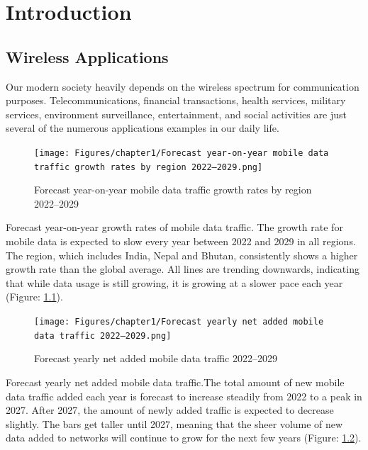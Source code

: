 
\chapter{Introduction} %

\label{Chapter1} %


\section{\textbf{Wireless Applications}}

Our modern society heavily depends on the wireless spectrum for communication purposes.
Telecommunications, financial transactions, health services, military services, environment
surveillance, entertainment, and social activities are just several of the numerous applications
examples in our daily life.
\begin{figure}
    \centering
    \texttt{[image: Figures/chapter1/Forecast year-on-year mobile data traffic growth rates by region 2022–2029.png]}
    \caption{Forecast year-on-year mobile data traffic growth rates by region 2022–2029 \cite{ref26}}
    \label{fig:forecast1}
\end{figure}

Forecast year-on-year growth rates of mobile data traffic. The growth rate for mobile data is expected to slow every year between 2022 and 2029 in all regions. The region, which includes India, Nepal and Bhutan, consistently shows a higher growth rate than the global average.
All lines are trending downwards, indicating that while data usage is still growing, it is growing at a slower pace each year (Figure: \ref{fig:forecast1}).  

\begin{figure}
    \centering
    \texttt{[image: Figures/chapter1/Forecast yearly net added mobile data traffic 2022–2029.png]}
    \caption{Forecast yearly net added mobile data traffic 2022–2029 \cite{ref26}}
    \label{fig:forecast2}
\end{figure}

 Forecast yearly net added mobile data traffic.The total amount of new mobile data traffic added each year is forecast to increase steadily from 2022 to a peak in 2027. After 2027, the amount of newly added traffic is expected to decrease slightly. The bars get taller until 2027, meaning that the sheer volume of new data added to networks will continue to grow for the next few years (Figure: \ref{fig:forecast2}).


